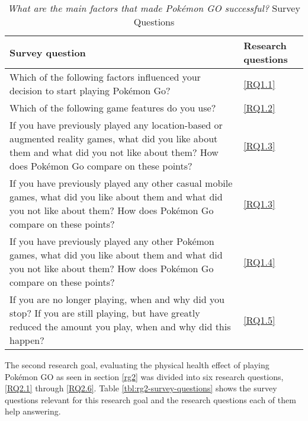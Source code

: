 \begin{table}[h]
	\caption{\emph{What are the main factors that made Pokémon GO successful?} Survey Questions}
	\centering
	\label{tbl:rg1-survey-questions}
	\begin{tabularx}{\textwidth}{|X|l|}
		\hline
		\textbf{Survey question} & \textbf{Research questions}\\
		\hline\hline
		
		Which of the following factors influenced your decision to start playing Pokémon Go? & \ref{RQ1.1}\\
		\hline
		
		Which of the following game features do you use? & \ref{RQ1.2}\\
		\hline
		
		If you have previously played any location-based or augmented reality games, what did you like about them and what did you not like about them? How does Pokémon Go compare on these points? & \ref{RQ1.3}\\
		\hline
		
		If you have previously played any other casual mobile games, what did you like about them and what did you not like about them? How does Pokémon Go compare on these points? & \ref{RQ1.3}\\
		\hline
		
		If you have previously played any other Pokémon games, what did you like about them and what did you not like about them? How does Pokémon Go compare on these points? & \ref{RQ1.4}\\
		\hline
		
		If you are no longer playing, when and why did you stop? If you are still playing, but have greatly reduced the amount you play, when and why did this happen? & \ref{RQ1.5}\\
		\hline
	\end{tabularx}
\end{table}

The second research goal, evaluating the physical health effect of playing Pokémon GO as seen in section \ref{rg2} was divided into six research questions, \ref{RQ2.1} through \ref{RQ2.6}. Table \ref{tbl:rg2-survey-questions} shows the survey questions relevant for this research goal and the research questions each of them help answering.

